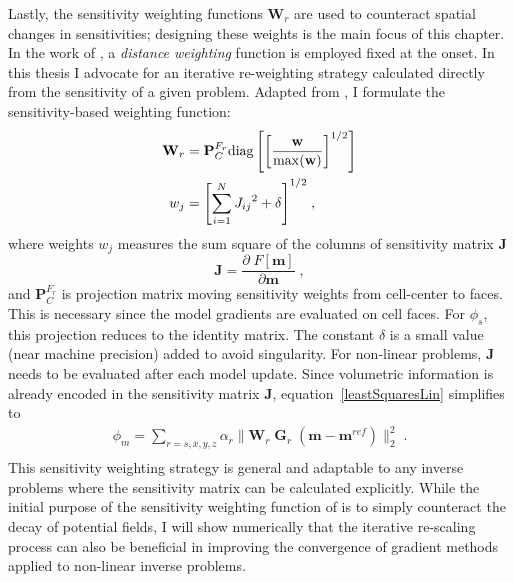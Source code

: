 Lastly, the sensitivity weighting functions $\mathbf{W}_{r}$ are used to counteract spatial changes in sensitivities; designing these weights is the main focus of this chapter. In the work of \cite{LiOldenburg1996}, a \emph{distance weighting} function is employed fixed at the onset.
In this thesis I advocate for an iterative re-weighting strategy calculated directly from the sensitivity of a given problem. Adapted from \cite{Haber1997}, I formulate the sensitivity-based weighting function:
\begin{equation}\label{iter_sens_weight}
\begin{split}
\mathbf{W}_r &= \mathbf{P}_C^{F_r} \rm{diag} \left[ {\left[\frac{\mathbf{ w}}{\rm{max}(\mathbf{ w})}\right]}^{1/2}\right]\\
w_{j} &= {\left[\sum_{i=1}^{N}{J_{ij}}^2 + \delta \right]}^{1/2}\;,
\end{split}
\end{equation}
where weights $w_j$ measures the sum square of the columns of sensitivity matrix $\mathbf{J}$
\begin{equation}\label{Jk}
\mathbf{J} = \frac{\partial \; F[\mathbf{m}]}{\partial \boldsymbol{\mathbf{m}}}\;,
\end{equation}
and $\mathbf{P}_C^{F_r}$ is projection matrix moving sensitivity weights from cell-center to faces. This is necessary since the model gradients are evaluated on cell faces. For $\phi_s$, this projection reduces to the identity matrix. The constant $\delta$ is a small value (near machine precision) added to avoid singularity. For non-linear problems, $\mathbf{J}$ needs to be evaluated after each model update. Since volumetric information is already encoded in the sensitivity matrix $\mathbf{J}$, equation~\eqref{leastSquaresLin} simplifies to
\begin{equation}\label{leastSquaresLinNoVol}
\begin{split}
\phi_m = \sum_{r=s,x,y,z} \alpha_r \|\mathbf{W}_r \;\mathbf{G}_r \;(\mathbf{m}-\mathbf{m}^{ref})\|_2^2 \;.\\
\end{split}
\end{equation}
This sensitivity weighting strategy is general and adaptable to any inverse problems where the sensitivity matrix can be calculated explicitly.
While the initial purpose of the sensitivity weighting function of \cite{LiOldenburg1996} is to simply counteract the decay of potential fields, I will show numerically that the iterative re-scaling process can also be beneficial in improving the convergence of gradient methods applied to non-linear inverse problems.

